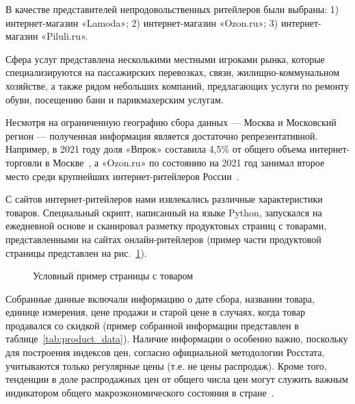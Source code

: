 В качестве представителей непродовольственных ритейлеров были выбраны:
1) интернет-магазин «Lamoda»;
2) интернет-магазин «Ozon.ru»;
3) интернет-магазин «Piluli.ru».

Сфера услуг представлена несколькими местными игроками рынка, которые специализируются на пассажирских перевозках, связи, жилищно-коммунальном хозяйстве, а также рядом небольших компаний, предлагающих услуги по ремонту обуви, посещению бани и парикмахерским услугам.

Несмотря на ограниченную географию сбора данных — Москва и Московский регион — полученная информация является достаточно репрезентативной. Например, в 2021 году доля «Впрок» составила 4,5\% от общего объема интернет-торговли в Москве~\cite{X5DigitalSales2021}, а «Ozon.ru» по состоянию на 2021 год занимал второе место среди крупнейших интернет-ритейлеров России~\cite{Top100Ecommerce2021}.

С сайтов интернет-ритейлеров нами извлекались различные характеристики товаров. Специальный скрипт, написанный на языке Python, запускался на ежедневной основе и сканировал разметку продуктовых страниц с товарами, представленными на сайтах онлайн-ритейлеров (пример части продуктовой страницы представлен на рис.~\cref{fig:example_product}).

\begin{figure}[ht]
	\caption{Условный пример страницы с товаром}\label{fig:example_product}
\end{figure}


Собранные данные включали информацию о дате сбора, названии товара, единице измерения, цене продажи и старой цене в случаях, когда товар продавался со скидкой (пример собранной информации представлен в таблице~\ref{tab:product_data}). Наличие информации о  особенно важно, поскольку для построения индексов цен, согласно официальной методологии Росстата, учитываются только регулярные цены (т.е. не цены распродаж). Кроме того, тенденции в доле распродажных цен от общего числа цен могут служить важным индикатором общего макроэкономического состояния в стране~\cite{Nakamura2008}. 

